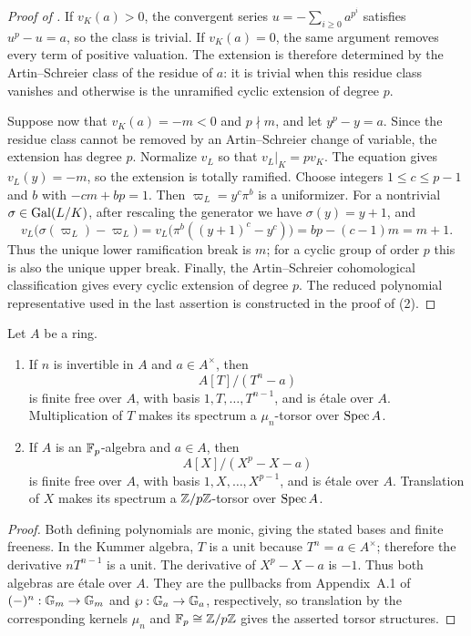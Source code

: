\begin{proof}[Proof of ]
If $v_K(a)>0$, the convergent series
$u=-\sum_{i\geq0}a^{p^i}$ satisfies $u^p-u=a$, so the class is trivial. If
$v_K(a)=0$, the same argument removes every term of positive valuation. The
extension is therefore determined by the Artin--Schreier class of the residue
of $a$: it is trivial when this residue class vanishes and otherwise is the
unramified cyclic extension of degree $p$.

Suppose now that $v_K(a)=-m<0$ and $p\nmid m$, and let $y^p-y=a$. Since the
residue class cannot be removed by an Artin--Schreier change of variable, the
extension has degree $p$. Normalize $v_L$ so that $v_L|_K=pv_K$. The equation
gives $v_L(y)=-m$, so the extension is totally ramified. Choose integers
$1\leq c\leq p-1$ and $b$ with $-cm+bp=1$. Then
$\varpi_L=y^c\pi^b$ is a uniformizer. For a nontrivial
$\sigma\in\operatorname{Gal}(L/K)$, after rescaling the generator we have
$\sigma(y)=y+1$, and
\[
v_L\bigl(\sigma(\varpi_L)-\varpi_L\bigr)
=v_L\bigl(\pi^b((y+1)^c-y^c)\bigr)
=bp-(c-1)m=m+1.
\]
Thus the unique lower ramification break is $m$; for a cyclic group of order
$p$ this is also the unique upper break. Finally, the Artin--Schreier
cohomological classification gives every cyclic extension of degree $p$.
The reduced polynomial representative used in the last assertion is
constructed in the proof of (2).
\end{proof}

\begin{lemma}
\label{lemma:classical_cyclic_equations_etale_torsors}
Let $A$ be a ring.
\begin{enumerate}[label=(\roman*)]
    \item If $n$ is invertible in $A$ and $a\in A^\times$, then
    \[
    A[T]/(T^n-a)
    \]
    is finite free over $A$, with basis $1,T,\dots,T^{n-1}$, and is
    \'etale over $A$. Multiplication of $T$ makes its spectrum a
    $\mu_n$-torsor over $\operatorname{Spec} A$.
    \item If $A$ is an $\mathbb{F}_p$-algebra and $a\in A$, then
    \[
    A[X]/(X^p-X-a)
    \]
    is finite free over $A$, with basis $1,X,\dots,X^{p-1}$, and is
    \'etale over $A$. Translation of $X$ makes its spectrum a
    $\mathbb{Z}/p\mathbb{Z}$-torsor over $\operatorname{Spec} A$.
\end{enumerate}
\end{lemma}

\begin{proof}
Both defining polynomials are monic, giving the stated bases and finite
freeness. In the Kummer algebra, $T$ is a unit because $T^n=a\in A^\times$;
therefore the derivative $nT^{n-1}$ is a unit. The derivative of
$X^p-X-a$ is $-1$. Thus both algebras are \'etale over $A$. They are the
pullbacks from Appendix~A.1 of $(-)^n:\mathbb{G}_m\to\mathbb{G}_m$ and
$\wp:\mathbb{G}_a\to\mathbb{G}_a$, respectively, so translation by the corresponding
kernels $\mu_n$ and $\mathbb{F}_p\cong\mathbb{Z}/p\mathbb{Z}$ gives the asserted torsor structures.
\end{proof}

